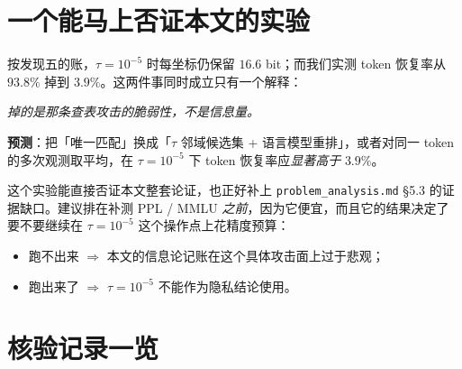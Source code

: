 \documentclass[UTF8, fontset=macnew, 11pt]{ctexart}
\begin{document}
\section{一个能马上否证本文的实验}

\begin{plainbox}
按发现五的账，$\tau=10^{-5}$ 时每坐标仍保留 $16.6$ bit；而我们实测 token 恢复率从 $93.8\%$ 掉到 $3.9\%$。这两件事同时成立只有一个解释：

\begin{center}
\emph{掉的是那条查表攻击的脆弱性，不是信息量。}
\end{center}

\textbf{预测}：把「唯一匹配」换成「$\tau$ 邻域候选集 + 语言模型重排」，或者对同一 token 的多次观测取平均，在 $\tau=10^{-5}$ 下 token 恢复率应\emph{显著高于} $3.9\%$。

这个实验能直接否证本文整套论证，也正好补上 \texttt{problem\_analysis.md} §5.3 的证据缺口。建议排在补测 PPL / MMLU \emph{之前}，因为它便宜，而且它的结果决定了要不要继续在 $\tau=10^{-5}$ 这个操作点上花精度预算：
\begin{itemize}
  \item 跑不出来 $\Rightarrow$ 本文的信息论记账在这个具体攻击面上过于悲观；
  \item 跑出来了 $\Rightarrow$ $\tau=10^{-5}$ 不能作为隐私结论使用。
\end{itemize}
\end{plainbox}

\section{核验记录一览}
\end{document}
